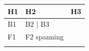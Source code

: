 \begin{longtable}[]{@{}lll@{}}
\hline
H1\par
 & H2\par
 & H3\par
\tabularnewline
\hline
\endfirsthead
B1\par
 & B2   | B3\par
\tabularnewline
\hline
\hline
F1\par
 & F2 spanning\par
\tabularnewline
\endlastfoot
\end{longtable}
